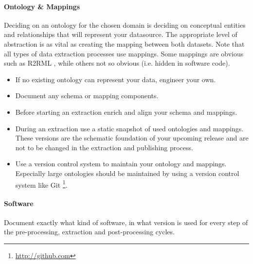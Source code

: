 \documentclass[a4paper,english,twoside,BCOR1.5cm,headsepline,DIV12,appendixprefix,final,12pt]{scrbook}
\begin{document}
\vspace{-1.5em}
\paragraph{Ontology \& Mappings}
\label{sec:less.onto}
Deciding on an ontology for the chosen domain is deciding on conceptual entities and relationships that will represent your datasource. The appropriate level of abstraction is as vital as creating the mapping between both datasets. Note that all types of data extraction processes use mappings. Some mappings are obvious such as R2RML \cite{r2rml}, while others not so obvious (i.e. hidden in software code).

\begin{itemize}
\itemsep0em 
\item If no existing ontology can represent your data, engineer your own. %
\item Document any schema or mapping components. 
\item Before starting an extraction enrich and align your schema and mappings.
\item During an extraction use a static snapshot of used ontologies and mappings. These versions are the schematic foundation of your upcoming release and are not to be changed in the extraction and publishing process.

\item Use a version control system to maintain your ontology and mappings. Especially large ontologies should be maintained by using a version control system like Git \footnote{\url{http://github.com}}.
\end{itemize}

\vspace{-1.5em}
\paragraph{Software}
Document exactly what kind of software, in what version is used for every step of the pre-processing, extraction and post-processing cycles.
\end{document}
